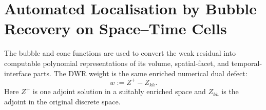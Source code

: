 \documentclass[11pt,a4paper]{article}
\newcommand{\X}{\mathcal{X}}
\newcommand{\J}{\mathcal{J}}
\begin{document}








\section{Automated Localisation by Bubble Recovery on Space--Time Cells}
\label{sec:localisation}

The bubble and cone functions are used to convert the weak residual into computable polynomial representations of its volume, spatial-facet, and temporal-interface parts. The DWR weight is the same enriched numerical dual defect:
\begin{equation}
 w:=Z^{+}-Z_{kh}.
 \label{eq:single-dual-weight}
\end{equation}
Here \(Z^{+}\) is one adjoint solution in a suitably enriched space and
\(Z_{kh}\) is the adjoint in the original discrete space. 
\end{document}
